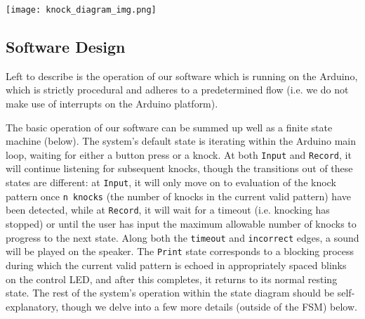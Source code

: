 \documentclass[11pt]{article}			%
\begin{document}
\begin{center}
\texttt{[image: knock\_diagram\_img.png]}
\end{center}

\subsection{Software Design}

Left to describe is the operation of our software which is running on the Arduino, which is strictly procedural and adheres to a predetermined flow (i.e. we do not make use of interrupts on the Arduino platform).

The basic operation of our software can be summed up well as a finite state machine (below). The system's default state is iterating within the Arduino main loop, waiting for either a button press or a knock. At both \verb|Input| and \verb|Record|, it will continue listening for subsequent knocks, though the transitions out of these states are different: at \verb|Input|, it will only move on to evaluation of the knock pattern once \verb|n knocks| (the number of knocks in the current valid pattern) have been detected, while at \verb|Record|, it will wait for a timeout (i.e. knocking has stopped) or until the user has input the maximum allowable number of knocks to progress to the next state. Along both the \verb|timeout| and \verb|incorrect| edges, a sound will be played on the speaker. The \verb|Print| state corresponds to a blocking process during which the current valid pattern is echoed in appropriately spaced blinks on the control LED, and after this completes, it returns to its normal resting state. The rest of the system's operation within the state diagram should be self-explanatory, though we delve into a few more details (outside of the FSM) below.
\end{document}
